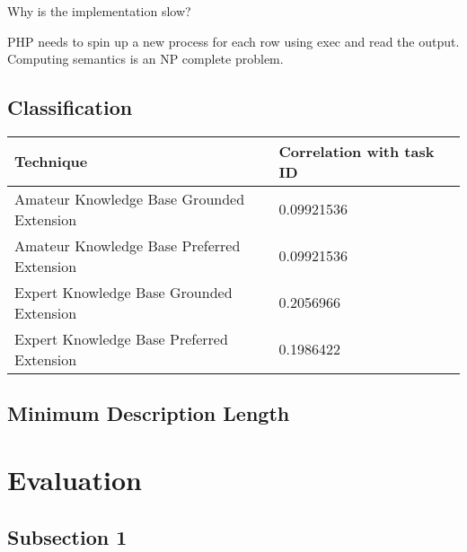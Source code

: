 Why is the implementation slow?

PHP needs to spin up a new process for each row using exec and read the output.
Computing semantics is an NP complete problem.


\subsection{Classification}


\begin{center}
    \begin{tabular}{ | l | l | l |}
    \hline
    Technique & Correlation with task ID \\ \hline
    Amateur Knowledge Base Grounded Extension & 0.09921536\\ \hline
    Amateur Knowledge Base Preferred Extension & 0.09921536\\ \hline
    Expert Knowledge Base Grounded Extension & 0.2056966\\ \hline
    Expert Knowledge Base Preferred Extension & 0.1986422\\ \hline
    \end{tabular}
\end{center}

\subsection{Minimum Description Length}




\section{Evaluation}


\subsection{Subsection 1}


